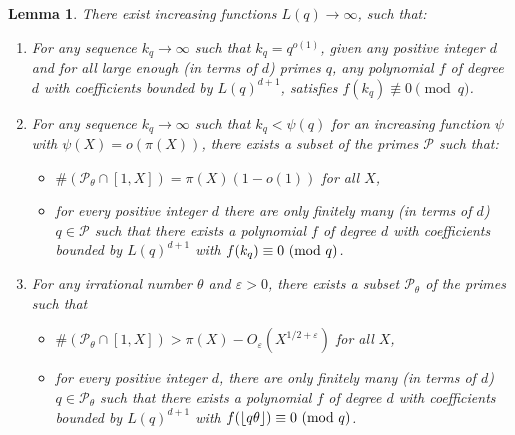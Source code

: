 \documentclass[12pt, a4paper]{amsart}
\newtheorem{lemma}{Lemma}
\theoremstyle{remark}
\newcommand{\floor}[1]{\left\lfloor#1\right\rfloor}
\renewcommand{\mod}[1]{{\ifmmode\text{\rm\ (mod~$#1$)}\else\discretionary{}{}{\hbox{ }}\rm(mod~$#1$)\fi}}
\newcommand{\cP}{\mathcal{P}}
\begin{document}
\begin{lemma}\label{lemma:goodprimes}There exist increasing functions $L(q)\to\infty$, such that:
    \begin{enumerate}
    \item[(1)] For any sequence $k_q\to\infty$ such that $k_q = q^{o(1)}$,
        given any positive integer $d$ and for all large enough (in terms of $d$)
        primes $q$, any polynomial $f$ of degree $d$ with coefficients bounded
        by $L(q)^{d+1}$, satisfies $f(k_q)\not\equiv 0\pmod q$. 
    \item[(2)]
        For any sequence $k_q\to\infty$ such that
        $k_q < \psi(q)$ for an increasing function $\psi$ with $\psi(X) = o(\pi(X))$, there exists a subset of the primes $\cP$ such that:
        \begin{itemize}
            \item $\#(\cP_\theta \cap [1,X]) = \pi(X)(1 - o(1))$ for all $X$,
            \item for every positive integer $d$ 
        there are only finitely many (in terms of $d$) $q \in \cP$ such that there
        exists a polynomial $f$ of degree $d$ with coefficients bounded by $L(q)^{d+1}$
        with $f(k_q) \equiv 0 \mod q$.
        \end{itemize}
    \item[(3)] For any irrational number $\theta$ and $\varepsilon > 0$, there exists a
    subset $\cP_\theta$ of the primes such that
    \begin{itemize}
        \item $\#(\cP_\theta \cap [1,X]) > \pi(X) - O_{\varepsilon}(X^{1/2 + \varepsilon})$ for all $X$,
        \item for every positive integer $d$, there are only finitely many (in terms of $d$)
            $q \in \cP_\theta$ such that there exists a
            polynomial $f$ of degree $d$ with coefficients bounded by
            $L(q)^{d+1}$ 
        with $f(\floor{q\theta}) \equiv 0 \mod q$.
    \end{itemize}
\end{enumerate}
\end{lemma}
\end{document}
